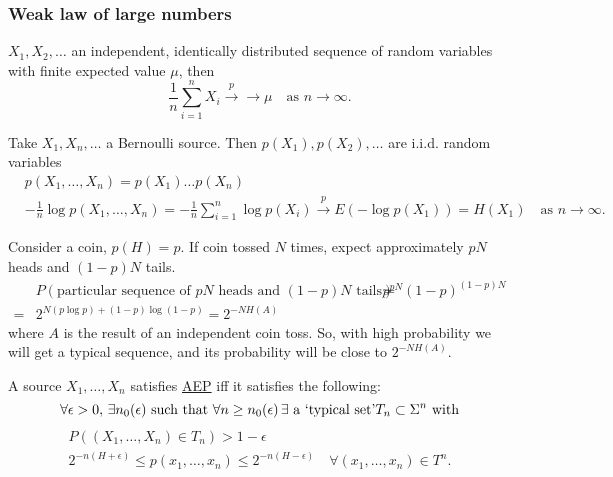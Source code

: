 \documentclass{article}
\begin{document}
\subsubsection*{Weak law of large numbers}
$X_1, X_2, \dotsc$ an independent, identically distributed sequence of random variables with finite expected value $\mu$, then
\begin{equation*}
    \frac{1}{n} \sum_{i=1}^n X_i \xrightarrow{p} \to \mu \quad \text{as } n \to \infty.
\end{equation*}
\begin{eg}[Application]
    Take $X_1, X_n, \dotsc$ a Bernoulli source. Then $p(X_1), p(X_2), \dotsc$ are i.i.d. random variables
    \begin{align*}
        &p(X_1, \dotsc, X_n) = p(X_1) \dotsc p(X_n) \\
        &-\frac{1}{n} \log p(X_1, \dotsc, X_n) = -\frac{1}{n} \sum_{i=1}^n \log p(X_i) \xrightarrow{p} E(-\log p(X_1)) = H(X_1) \quad \text{as } n \to \infty.
    \end{align*}
\end{eg}
\begin{eg}
    Consider a coin, $p(H) = p$. If coin tossed $N$ times, expect approximately $pN$ heads and $(1-p)N$ tails.
    \begin{align*}
        &P(\text{particular sequence of $pN$ heads and $(1-p)N$ tails})
        =&p^{pN} (1-p)^{(1-p)N}\\
        =&2^{N(p \log p) + (1-p) \log (1-p)} = 2^{-N H(A)}
    \end{align*}
    where $A$ is the result of an independent coin toss.
    So, with high probability we will get a typical sequence, and its probability will be close to $2^{-NH(A)}$.
\end{eg}
\begin{nlemma}
    A source $X_1, \dotsc, X_n$ satisfies \hyperlink{def:aep}{AEP} iff it satisfies the following:
    \begin{equation*}
        \forall \epsilon > 0, \, \exists n_0(\epsilon) \text{ such that } \forall n \geq n_0(\epsilon) \, \exists \text{ a `typical set'} T_n \subset \Sigma^n \text{ with} \\
    \end{equation*}
    \begin{gather*}
        P((X_1, \dotsc, X_n) \in T_n) > 1 - \epsilon \\
        2^{-n(H+\epsilon)} \leq p(x_1, \dotsc, x_n) \leq 2^{-n(H-\epsilon)}\quad \forall (x_1, \dotsc, x_n) \in T^n.
        \tag{*}
    \end{gather*}
\end{nlemma}
\end{document}
